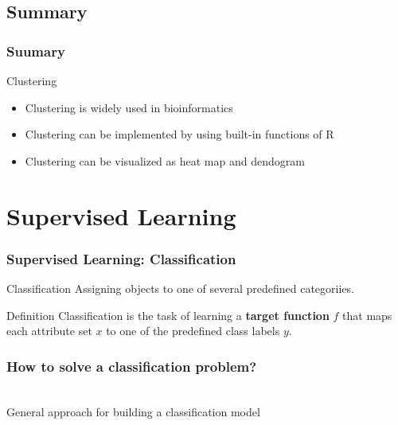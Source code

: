 \documentclass[UTF8]{beamer}\usepackage[]{graphicx}\usepackage[]{color}
\begin{document}
\subsection{Summary}

\begin{frame}[fragile]
  \frametitle{Suumary}
\begin{block}{Clustering}
  \begin{itemize}
  \item Clustering is widely used in bioinformatics
  \item Clustering can be implemented by using built-in functions of R
  \item Clustering can be visualized as heat map and dendogram
  \end{itemize}
\end{block}
\end{frame}


\section{Supervised Learning}

\begin{frame}
\frametitle{Supervised Learning: Classification}

\begin{block}{Classification}
Assigning objects to one of several predefined categoriies.
\end{block}


\begin{block}{Definition}
Classification is the task of learning a \textbf{target function} $f$ that maps each attribute set $x$ to one of the predefined class labels $y$.
\end{block}
\end{frame}


\begin{frame}
  \frametitle{How to solve a classification problem?}
\begin{center}
\\
General approach for building a classification model
\end{center}
\end{frame}
\end{document}
